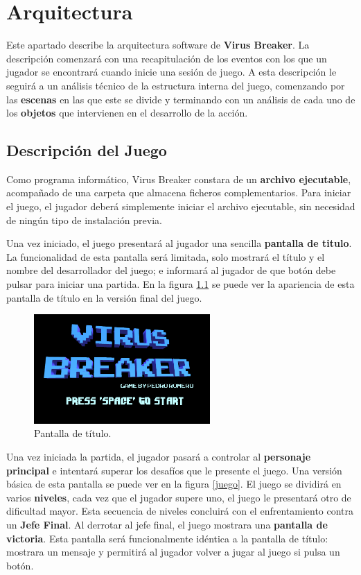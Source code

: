 \chapter{Arquitectura}
\label{Arquitectura}
Este apartado describe la arquitectura software de \textbf{Virus Breaker}. La descripción comenzará con una recapitulación de los eventos con los que un jugador se encontrará cuando inicie una sesión de juego. A esta descripción le seguirá a un análisis técnico de la estructura interna del juego, comenzando por las \textbf{escenas} en las que este se divide y terminando con un análisis de cada uno de los \textbf{objetos} que intervienen en el desarrollo de la acción.

\section{Descripción del Juego}
Como programa informático, Virus Breaker constara de un \textbf{archivo ejecutable}, acompañado de una carpeta que almacena ficheros complementarios. Para iniciar el juego, el jugador deberá simplemente iniciar el archivo ejecutable, sin necesidad de ningún tipo de instalación previa.

Una vez iniciado, el juego presentará al jugador una sencilla \textbf{pantalla de titulo}. La funcionalidad de esta pantalla será limitada, solo mostrará el título y el nombre del desarrollador del juego; e informará al jugador de que botón debe pulsar para iniciar una partida. En la figura \ref{titulo} se puede ver la apariencia de esta pantalla de título en la versión final del juego.
\begin{figure}[h]
    \centering
    \label{titulo}
    \includegraphics[width=0.6\textwidth]{images/estructura/escenas/titulo}
    \caption{Pantalla de título.}
\end{figure}

Una vez iniciada la partida, el jugador pasará a controlar al \textbf{personaje principal} e intentará superar los desafíos que le presente el juego. Una versión básica de esta pantalla se puede ver en la figura \ref{juego}. El juego se dividirá en varios \textbf{niveles}, cada vez que el jugador supere uno, el juego le presentará otro de dificultad mayor. Esta secuencia de niveles concluirá con el enfrentamiento contra un \textbf{Jefe Final}. Al derrotar al jefe final, el juego mostrara una \textbf{pantalla de victoria}. Esta pantalla será funcionalmente idéntica a la pantalla de título: mostrara un mensaje y permitirá al jugador volver a jugar al juego si pulsa un botón. 

